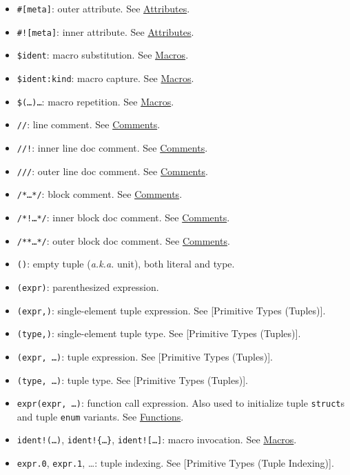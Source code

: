 \documentclass[a4paper,]{book}
\providecommand{\tightlist}{%
  \setlength{\itemsep}{0pt}\setlength{\parskip}{0pt}}
\begin{document}
\begin{itemize}
\tightlist
\item
  \texttt{\#{[}meta{]}}: outer attribute. See
  \protect\hyperlink{sec--attributes}{Attributes}.
\item
  \texttt{\#!{[}meta{]}}: inner attribute. See
  \protect\hyperlink{sec--attributes}{Attributes}.
\item
  \texttt{\$ident}: macro substitution. See
  \protect\hyperlink{sec--macros}{Macros}.
\item
  \texttt{\$ident:kind}: macro capture. See
  \protect\hyperlink{sec--macros}{Macros}.
\item
  \texttt{\$(\ldots{})\ldots{}}: macro repetition. See
  \protect\hyperlink{sec--macros}{Macros}.
\end{itemize}

\begin{itemize}
\tightlist
\item
  \texttt{//}: line comment. See
  \protect\hyperlink{sec--comments}{Comments}.
\item
  \texttt{//!}: inner line doc comment. See
  \protect\hyperlink{sec--comments}{Comments}.
\item
  \texttt{///}: outer line doc comment. See
  \protect\hyperlink{sec--comments}{Comments}.
\item
  \texttt{/*\ldots{}*/}: block comment. See
  \protect\hyperlink{sec--comments}{Comments}.
\item
  \texttt{/*!\ldots{}*/}: inner block doc comment. See
  \protect\hyperlink{sec--comments}{Comments}.
\item
  \texttt{/**\ldots{}*/}: outer block doc comment. See
  \protect\hyperlink{sec--comments}{Comments}.
\end{itemize}

\begin{itemize}
\tightlist
\item
  \texttt{()}: empty tuple (\emph{a.k.a.} unit), both literal and type.
\item
  \texttt{(expr)}: parenthesized expression.
\item
  \texttt{(expr,)}: single-element tuple expression. See {[}Primitive
  Types (Tuples){]}.
\item
  \texttt{(type,)}: single-element tuple type. See {[}Primitive Types
  (Tuples){]}.
\item
  \texttt{(expr,\ \ldots{})}: tuple expression. See {[}Primitive Types
  (Tuples){]}.
\item
  \texttt{(type,\ \ldots{})}: tuple type. See {[}Primitive Types
  (Tuples){]}.
\item
  \texttt{expr(expr,\ \ldots{})}: function call expression. Also used to
  initialize tuple \texttt{struct}s and tuple \texttt{enum} variants.
  See \protect\hyperlink{functions}{Functions}.
\item
  \texttt{ident!(\ldots{})}, \texttt{ident!\{\ldots{}\}},
  \texttt{ident!{[}\ldots{}{]}}: macro invocation. See
  \protect\hyperlink{sec--macros}{Macros}.
\item
  \texttt{expr.0}, \texttt{expr.1}, \ldots{}: tuple indexing. See
  {[}Primitive Types (Tuple Indexing){]}.
\end{itemize}
\end{document}
